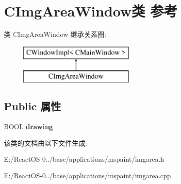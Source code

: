 \hypertarget{class_c_img_area_window}{}\section{C\+Img\+Area\+Window类 参考}
\label{class_c_img_area_window}
类 C\+Img\+Area\+Window 继承关系图\+:\begin{figure}[H]
\begin{center}
\leavevmode
\includegraphics[height=2.000000cm]{class_c_img_area_window}
\end{center}
\end{figure}
\subsection*{Public 属性}
\begin{DoxyCompactItemize}
\item 
\mbox{\label{class_c_img_area_window_a1e2335e425facd133b935c077fb3cb07}} 
B\+O\+OL {\bfseries drawing}
\end{DoxyCompactItemize}


该类的文档由以下文件生成\+:\begin{DoxyCompactItemize}
\item 
E\+:/\+React\+O\+S-\/0../base/applications/mspaint/imgarea.\+h\item 
E\+:/\+React\+O\+S-\/0../base/applications/mspaint/imgarea.\+cpp\end{DoxyCompactItemize}

